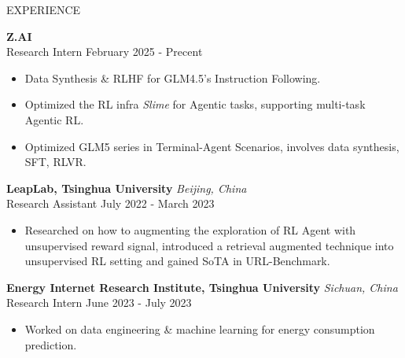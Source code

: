 \documentclass{resume} %
\begin{document}
\begin{rSection}{EXPERIENCE}

\textbf{Z.AI} \\
Research Intern \hfill February 2025 - Precent
 \begin{itemize}
    \itemsep -3pt {} 
     \item Data Synthesis \& RLHF for GLM4.5's Instruction Following. 
     \item Optimized the RL infra \textit{Slime} for Agentic tasks, supporting multi-task Agentic RL. 
     \item Optimized GLM5 series in Terminal-Agent Scenarios, involves data synthesis, SFT, RLVR. 
\end{itemize}

\textbf{LeapLab, Tsinghua University} \hfill \textit{Beijing, China} \\
Research Assistant \hfill July 2022 - March 2023
 \begin{itemize}
    \itemsep -3pt {} 
     \item Researched on how to augmenting the exploration of RL Agent with unsupervised reward signal, introduced a retrieval augmented technique into unsupervised RL setting and gained SoTA in URL-Benchmark. 
 \end{itemize}

\textbf{Energy Internet Research Institute, Tsinghua University} \hfill \textit{Sichuan, China}\\
Research Intern \hfill June 2023 - July 2023
\begin{itemize}
    \itemsep -3pt {} 
     \item Worked on data engineering \& machine learning for energy consumption prediction.
\end{itemize}
\end{rSection}

\end{document}
